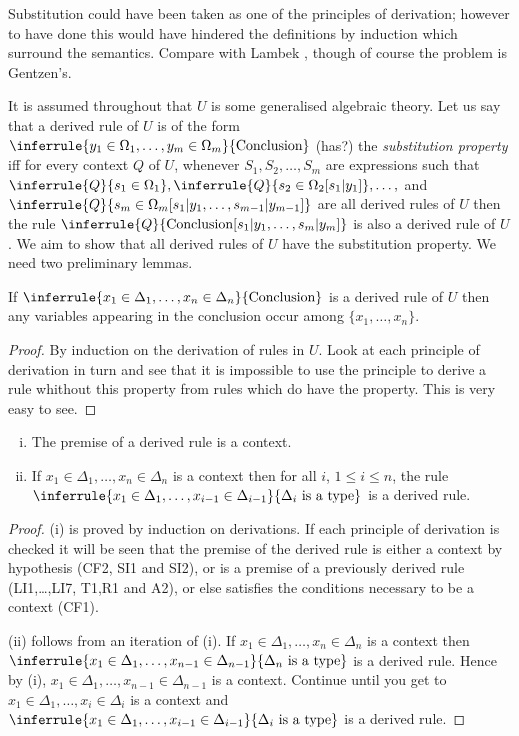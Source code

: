 Substitution could have been taken as one of the principles of derivation; however to have done this would have hindered the definitions by induction which surround the semantics.
%
Compare with Lambek \cite{19:lambek}, though of course the problem is Gentzen's.

It is assumed throughout that $U$ is some generalised algebraic theory.
%
Let us say that a derived rule of $U$ is of the form $\inferrule{y_1\in\Omega_1,\ldots,y_m\in\Omega_m}{\text{Conclusion}}$ (has?)  the \emph{substitution property} iff for every context $Q$ of $U$, whenever $S_1,S_2,\ldots,S_m$ are expressions such that $\inferrule{Q}{s_1\in\Omega_1},\inferrule{Q}{s_2\in\Omega_2[s_1|y_1]},\ldots,$ and $\inferrule{Q}{s_m\in\Omega_m[s_1|y_1,\ldots,s_{m-1}|y_{m-1}]}$ are all derived rules of $U$ then the rule $\inferrule{Q}{\text{Conclusion}[s_1|y_1,\ldots,s_m|y_m]}$ is also a derived rule of $U$. We aim to show that all derived rules of $U$ have the substitution property. We need two preliminary lemmas.

\begin{lemma}[1] If $\inferrule{x_1\in\Delta_1,\ldots,x_n\in\Delta_n}{\text{Conclusion}}$ is a derived rule of $U$ then any variables appearing in the conclusion occur among $\{x_1,\ldots, x_n\}$.
\end{lemma}
\begin{proof}
  By induction on the derivation of rules in $U$.
  Look at each principle of derivation in turn and see that it is impossible to use the principle to derive a rule whithout this property from rules which do have the property.
  This is very easy to see.
\end{proof}

\begin{lemma}[2]
  \begin{enumerate}[(i)]
    \item The premise of a derived rule is a context.
    \item If $x_1\in\Delta_1,\ldots,x_n\in\Delta_n$ is a context then for all $i$, $1\leq i\leq n$, the rule $\inferrule{x_1\in\Delta_1,\ldots,x_{i-1}\in\Delta_{i-1}}{\Delta_i\isatype}$ is a derived rule.
  \end{enumerate}
\end{lemma}
\begin{proof}
  (i) is proved by induction on derivations.
  If each principle of derivation is checked it will be seen that the premise of the derived rule is either a context by hypothesis (CF2, SI1 and SI2), or is a premise of a previously derived rule (LI1,\ldots,LI7, T1,R1 and A2), or else satisfies the conditions necessary to be a context (CF1).

  (ii) follows from an iteration of (i).
  If $x_1\in\Delta_1,\ldots,x_n\in\Delta_n$ is a context then $\inferrule{x_1\in\Delta_1,\ldots,x_{n-1}\in\Delta_{n-1}}{\Delta_n\isatype}$ is a derived rule. Hence by (i), $x_1\in\Delta_1,\ldots,x_{n-1}\in\Delta_{n-1}$ is a context.
  Continue until you get to $x_1\in\Delta_1,\ldots,x_i\in\Delta_i$ is a context and $\inferrule{x_1\in\Delta_1,\ldots,x_{i-1}\in\Delta_{i-1}}{\Delta_i\isatype}$ is a derived rule.
\end{proof}


